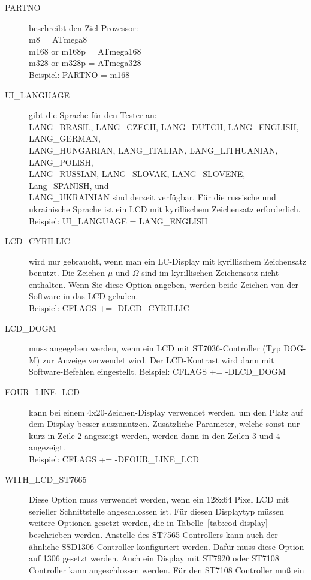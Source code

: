 \begin{description}
  \item[PARTNO] beschreibt den Ziel-Prozessor:\\
         m8 = ATmega8\\
         m168 or m168p = ATmega168\\
         m328 or m328p = ATmega328\\
    Beispiel: PARTNO = m168
  \item[UI\_LANGUAGE] gibt die Sprache für den Tester an:\\
    LANG\_BRASIL, LANG\_CZECH, LANG\_DUTCH, LANG\_ENGLISH, LANG\_GERMAN, \\
    LANG\_HUNGARIAN, LANG\_ITALIAN, LANG\_LITHUANIAN, LANG\_POLISH, \\
    LANG\_RUSSIAN, LANG\_SLOVAK, LANG\_SLOVENE, Lang\_SPANISH, und \\
    LANG\_UKRAINIAN sind derzeit verfügbar.
 Für die russische und ukrainische Sprache ist ein LCD mit kyrillischem Zeichensatz erforderlich.\\
    Beispiel: UI\_LANGUAGE = LANG\_ENGLISH
  \item[LCD\_CYRILLIC] wird nur gebraucht, wenn man ein LC-Display mit kyrillischem Zeichensatz benutzt.
Die Zeichen \(\mu\) und \(\Omega\) sind im kyrillischen Zeichensatz nicht enthalten.
Wenn Sie diese Option angeben, werden beide Zeichen von der Software in das LCD geladen.\\
Beispiel: CFLAGS += -DLCD\_CYRILLIC
  \item[LCD\_DOGM] muss angegeben werden, wenn ein LCD mit ST7036-Controller (Typ DOG-M) zur Anzeige verwendet wird.
Der LCD-Kontrast wird dann mit Software-Befehlen eingestellt.
Beispiel: CFLAGS += -DLCD\_DOGM
  \item[FOUR\_LINE\_LCD] kann bei einem 4x20-Zeichen-Display verwendet werden, um den Platz auf dem Display
besser auszunutzen. Zusätzliche Parameter, welche sonst nur kurz in Zeile 2 angezeigt werden, werden dann in
den Zeilen 3 und 4 angezeigt.\\
Beispiel: CFLAGS += -DFOUR\_LINE\_LCD
  \item[WITH\_LCD\_ST7665] Diese Option muss verwendet werden, wenn ein 128x64 Pixel LCD mit serieller
Schnittstelle angeschlossen ist. Für diesen Displaytyp müssen weitere Optionen gesetzt werden, die in Tabelle~\ref{tab:cod-display} 
beschrieben werden.
Anstelle des ST7565-Controllers kann auch der ähnliche SSD1306-Controller konfiguriert werden.
Dafür muss diese Option auf 1306 gesetzt werden.
Auch ein Display mit ST7920 oder ST7108 Controller kann angeschlossen werden. Für den ST7108 Controller muß ein

\end{description}
